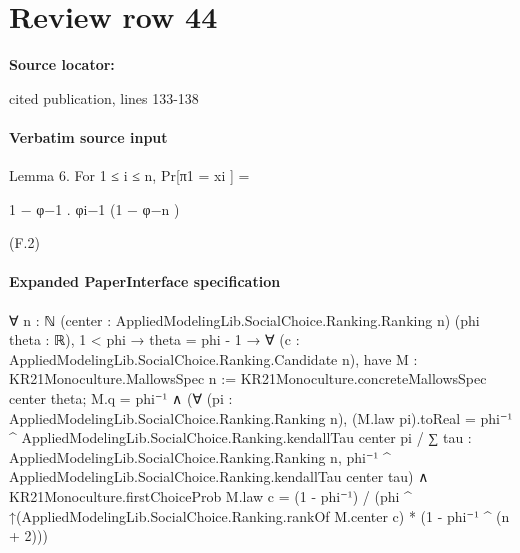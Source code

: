 \documentclass[10pt]{article}
\begin{document}
\section*{Review row 44}
\textbf{Source locator:} {\footnotesize\raggedright cited publication, lines 133-\allowbreak{}138\par}
\paragraph{Verbatim source input}
\begin{ReviewVerbatim}
Lemma 6. For 1 ≤ i ≤ n,
Pr[π1 = xi ] =

1 − φ−1
.
φi−1 (1 − φ−n )

(F.2)
\end{ReviewVerbatim}



\paragraph{Expanded PaperInterface specification}
\begin{ReviewVerbatim}
∀ {n : ℕ} (center : AppliedModelingLib.SocialChoice.Ranking.Ranking n) (phi theta : ℝ),
  1 < phi →
    theta = phi - 1 →
      ∀ (c : AppliedModelingLib.SocialChoice.Ranking.Candidate n),
        have M : KR21Monoculture.MallowsSpec n := KR21Monoculture.concreteMallowsSpec center theta;
        M.q = phi⁻¹ ∧
          (∀ (pi : AppliedModelingLib.SocialChoice.Ranking.Ranking n),
              (M.law pi).toReal =
                phi⁻¹ ^ AppliedModelingLib.SocialChoice.Ranking.kendallTau center pi /
                  ∑ tau : AppliedModelingLib.SocialChoice.Ranking.Ranking n,
                    phi⁻¹ ^ AppliedModelingLib.SocialChoice.Ranking.kendallTau center tau) ∧
            KR21Monoculture.firstChoiceProb M.law c =
              (1 - phi⁻¹) / (phi ^ ↑(AppliedModelingLib.SocialChoice.Ranking.rankOf M.center c) * (1 - phi⁻¹ ^ (n + 2)))
\end{ReviewVerbatim}
\end{document}
